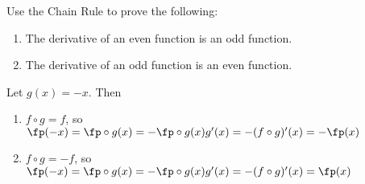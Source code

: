 {Use the Chain Rule to prove the following:
\begin{enumerate}
\item The derivative of an even function is an odd function.
\item The derivative of an odd function is an even function.
\end{enumerate}
}
{Let $g(x)=-x$.  Then
\begin{enumerate}
\item $f\circ g=f$, so $\fp(-x)=\fp\circ g(x)=-\fp\circ g(x)g'(x)=-(f\circ g)'(x)=-\fp(x)$
\item $f\circ g=-f$, so $\fp(-x)=\fp\circ g(x)=-\fp\circ g(x)g'(x)=-(f\circ g)'(x)=\fp(x)$
\end{enumerate}
}
